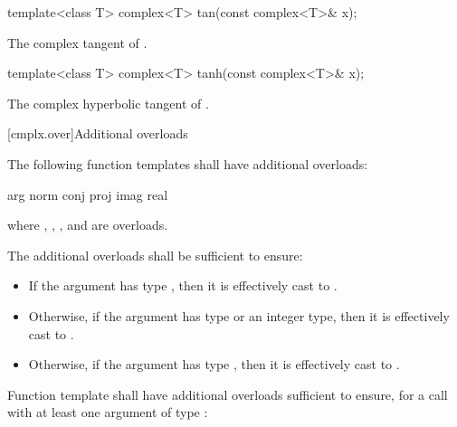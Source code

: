 %
\begin{itemdecl}
template<class T> complex<T> tan(const complex<T>& x);
\end{itemdecl}

\begin{itemdescr}
\pnum
\returns
The complex tangent of .
\end{itemdescr}

%
\begin{itemdecl}
template<class T> complex<T> tanh(const complex<T>& x);
\end{itemdecl}

\begin{itemdescr}
\pnum
\returns
The complex hyperbolic tangent of .
\end{itemdescr}

[cmplx.over]{Additional overloads}

\pnum
{}%
%
%
%
%
The following function templates shall have additional overloads:
\begin{codeblock}
arg                   norm
conj                  proj
imag                  real
\end{codeblock}
where , , , and  are  overloads.

\pnum
{}%
The additional overloads shall be sufficient to ensure:

\begin{itemize}
        \item If the argument has type , then it is effectively
              cast to .
        \item Otherwise, if the argument has type  or an integer type,
              then it is effectively cast to .
        \item Otherwise, if the argument has type , then it is
              effectively cast to .
\end{itemize}

\pnum
{}%
Function template  shall have additional overloads sufficient to
ensure, for a call with at least one argument of type :

